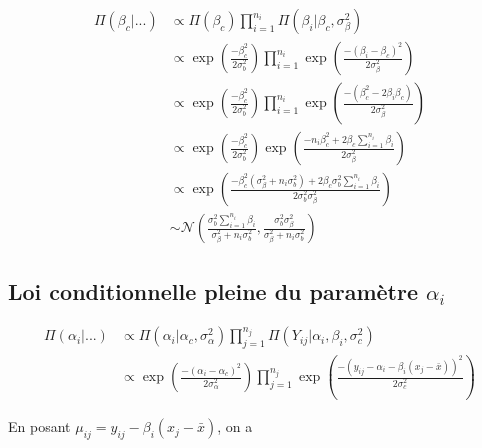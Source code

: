 \documentclass[
]{article}
\begin{document}
\begin{align*}
\Pi(\beta_{c}|...) &\propto \Pi(\beta_{c}) \prod_{i=1}^{n_{i}} \Pi(\beta_{i}|\beta_{c},\sigma_{\beta}^{2} ) \\
        &\propto \exp\left(\frac{-\beta_{c}^{2}}{2\sigma_{b}^{2}}\right)\prod_{i=1}^{n_{i}} \exp\left(\frac{-(\beta_{i}-\beta_{c})^{2}}{2\sigma_{\beta}^{2}}\right) \\
        &\propto \exp\left(\frac{-\beta_{c}^{2}}{2\sigma_{b}^{2}}\right)\prod_{i=1}^{n_{i}} \exp\left(\frac{-(\beta_{c}^{2}-2\beta_{i}\beta_{c})}{2\sigma_{\beta}^{2}}\right) \\
        &\propto \exp\left(\frac{-\beta_{c}^{2}}{2\sigma_{b}^{2}}\right) \exp\left(\frac{-n_i\beta_{c}^{2}+2\beta_{c}\sum\limits_{i=1}^{n_{i}} \beta_{i}}{2\sigma_{\beta}^{2}}\right)\\
        &\propto \exp\left(\frac{-\beta_{c}^{2}(\sigma_{\beta}^{2}+n_i\sigma_{b}^{2}) +2\beta_{c}\sigma_{b}^{2}\sum\limits_{i=1}^{n_{i}} \beta_{i}}{2\sigma_{b}^{2}\sigma_{\beta}^{2}}\right)\\
        &\sim \mathcal{N}\left(\frac{\sigma_{b}^{2}\sum\limits_{i=1}^{n_{i}} \beta_{i}}{\sigma_{\beta}^{2}+n_{i}\sigma_{b}^{2}},\frac{\sigma_{b}^{2}\sigma_{\beta}^{2}}{\sigma_{\beta}^{2}+n_{i}\sigma_{b}^{2}}\right)
\end{align*}

\hypertarget{loi-conditionnelle-pleine-du-paramuxe8tre-alpha_i}{%
\subsection{\texorpdfstring{Loi conditionnelle pleine du paramètre
\(\alpha_i\)}{Loi conditionnelle pleine du paramètre \textbackslash alpha\_i}}\label{loi-conditionnelle-pleine-du-paramuxe8tre-alpha_i}}

\begin{align*}
\Pi(\alpha_{i}|...) &\propto \Pi(\alpha_{i}|\alpha_{c},\sigma_{\alpha}^{2} ) \prod_{j=1}^{n_{j}} \Pi(Y_{ij}|\alpha_{i},\beta_{i},\sigma_{c}^{2} ) \\
        &\propto \exp\left(\frac{-(\alpha_{i}-\alpha_{c})^{2}}{2\sigma_{\alpha}^{2}}\right) \prod_{j=1}^{n_{j}} \exp\left(\frac{-(y_{ij}-\alpha_{i}-\beta_i(x_{j}-\bar{x}))^{2}}{2\sigma_{c}^{2}}\right) 
\end{align*}

En posant \(\mu_{ij} = y_{ij} - \beta_i(x_{j}-\bar{x})\), on a
\end{document}

